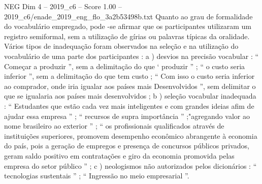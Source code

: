 \begin{textsample}{NEG Dim 4 – 2019\_c6 – Score 1.00 – 2019\_c6/enade\_2019\_eng\_flo\_3a2b53498b.txt}
Quanto ao grau de formalidade do vocabulário empregado, pode -se afirmar que os participantes utilizaram um registro semiformal, sem a utilização de gírias ou palavras típicas da oralidade.
Vários tipos de inadequação foram observados na seleção e na utilização do vocabulário de uma parte dos participantes : a ) desvios na precisão vocabular : “ Começar a produzir ”, sem a delimitação do que ‘ produzir ” ; “ o custo seria inferior ”, sem a delimitação do que tem custo ; “ Com isso o custo seria inferior ao comprador, onde iria igualar aos países mais Desenvolvidos ”, sem delimitar o que se igualaria aos países mais desenvolvidos ; b ) seleção vocabular inadequada : “ Estudantes que estão cada vez mais inteligentes e com grandes ideias afim de ajudar essa empresa ” ; “ recursos de supra importância ” ;"agregando valor ao nome brasileiro ao exterior ” ; “ os profissionais qualificados através de instituições superiores, promovem desempenho econômico abrangente à economia do país, pois a geração de empregos e presença de concursos públicos privados, geram saldo positivo em contratações e giro da economia promovida pelas empresa do setor público ” ; c ) neologismos não autorizados pelos dicionários : “ tecnologias sustentais ” ; “ Ingressão no meio empresarial ”.

\end{textsample}
